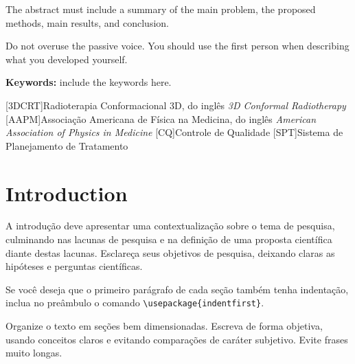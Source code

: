 \documentclass[a4paper, 12pt]{ppgeb}
\begin{document}
The abstract must include a summary of the main problem, the proposed methods, main results, and conclusion.

Do not overuse the passive voice. You should use the first person when describing what you developed yourself.

\vspace{14pt}

\noindent\textbf{Keywords: }include the keywords here.


\acresetall %

\indice

\begin{center}

{\bfseries{} }%
\end{center}

[3DCRT]{Radioterapia Conformacional 3D, do inglês \emph{3D Conformal Radiotherapy}}
[AAPM]{Associação Americana de Física na Medicina, do inglês \emph{American Association of Physics in Medicine}}
[CQ]{Controle de Qualidade}
[SPT]{Sistema de Planejamento de Tratamento}

\begin{acronym}
\end{acronym}

\clearpage


\chapter{Introduction}

A introdução deve apresentar uma contextualização sobre o tema de pesquisa, culminando nas lacunas de pesquisa e na definição de uma proposta científica diante destas lacunas. Esclareça seus objetivos de pesquisa, deixando claras as hipóteses e perguntas científicas.

Se você deseja que o primeiro parágrafo de cada seção também tenha indentação, inclua no preâmbulo o comando \verb,\usepackage{indentfirst},.

Organize o texto em seções bem dimensionadas. Escreva de forma objetiva, usando conceitos claros e evitando comparações de caráter subjetivo. Evite frases muito longas.
\end{document}
